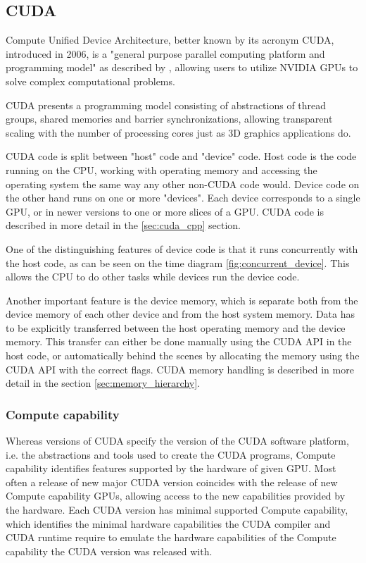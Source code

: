 \subsection{CUDA}
\label{sec:cuda}

Compute Unified Device Architecture, better known by its acronym CUDA, introduced in 2006, is a "general purpose parallel computing platform and programming model" as described by \citep{site:cuda}, allowing users to utilize NVIDIA GPUs to solve complex computational problems.


CUDA presents a programming model consisting of abstractions of thread groups, shared memories and barrier synchronizations, allowing transparent scaling with the number of processing cores just as 3D graphics applications do.

CUDA code is split between "host" code and "device" code. Host code is the code running on the CPU, working with operating memory and accessing the operating system the same way any other non-CUDA code would. Device code on the other hand runs on one or more "devices". Each device corresponds to a single GPU, or in newer versions to one or more slices of a GPU. CUDA code is described in more detail in the \ref{sec:cuda_cpp} section.

One of the distinguishing features of device code is that it runs concurrently with the host code, as can be seen on the time diagram \ref{fig:concurrent_device}. This allows the CPU to do other tasks while devices run the device code.

Another important feature is the device memory, which is separate both from the device memory of each other device and from the host system memory. Data has to be explicitly transferred between the host operating memory and the device memory. This transfer can either be done manually using the CUDA API in the host code, or automatically behind the scenes by allocating the memory using the CUDA API with the correct flags. CUDA memory handling is described in more detail in the section \ref{sec:memory_hierarchy}.


\subsubsection{Compute capability}
\label{sec:compute_capability}
Whereas versions of CUDA specify the version of the CUDA software platform, i.e. the abstractions and tools used to create the CUDA programs, Compute capability identifies features supported by the hardware of given GPU. Most often a release of new major CUDA version coincides with the release of new Compute capability GPUs, allowing access to the new capabilities provided by the hardware. Each CUDA version has minimal supported Compute capability, which identifies the minimal hardware capabilities the CUDA compiler and CUDA runtime require to emulate the hardware capabilities of the Compute capability the CUDA version was released with.

